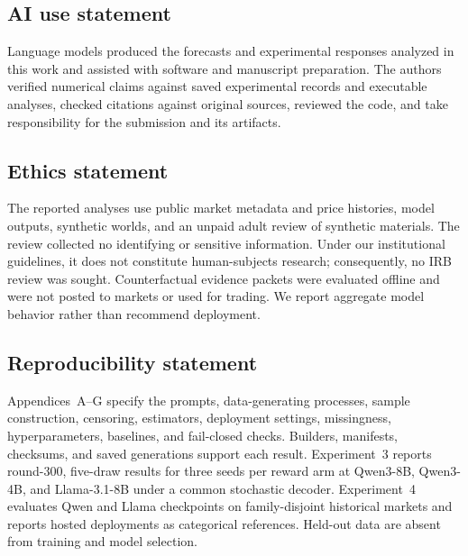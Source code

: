 \subsection*{AI use statement}

Language models produced the forecasts and experimental responses analyzed in this
work and assisted with software and manuscript preparation. The authors verified
numerical claims against saved experimental records and executable analyses, checked
citations against original sources, reviewed the code, and take responsibility for
the submission and its artifacts.

\subsection*{Ethics statement}

The reported analyses use public market metadata and price histories, model
outputs, synthetic worlds, and an unpaid adult review of synthetic materials. The
review collected no identifying or sensitive information. Under our institutional
guidelines, it does not constitute human-subjects research; consequently, no IRB
review was sought. Counterfactual evidence packets were evaluated offline and were
not posted to markets or used for trading. We report aggregate model behavior
rather than recommend deployment.

\subsection*{Reproducibility statement}
Appendices~A--G specify the prompts, data-generating processes, sample construction,
censoring, estimators, deployment settings, missingness, hyperparameters, baselines,
and fail-closed checks. Builders, manifests, checksums, and saved generations support
each result. Experiment~3 reports round-300, five-draw results for three seeds per
reward arm at Qwen3-8B, Qwen3-4B, and Llama-3.1-8B under a common stochastic decoder.
Experiment~4 evaluates Qwen and Llama checkpoints on family-disjoint historical
markets and reports hosted deployments as categorical references. Held-out data are
absent from training and model selection.
